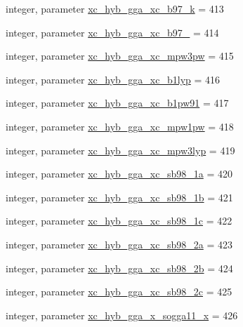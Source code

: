 \begin{DoxyCompactItemize}
\item 
integer, parameter \hyperlink{classlibxc__funcs__m_a78edfd528873c358d22ea9dbe638b4a0}{xc\-\_\-hyb\-\_\-gga\-\_\-xc\-\_\-b97\-\_\-k} = 413
\item 
integer, parameter \hyperlink{classlibxc__funcs__m_acc031fe40786b087f4a2bd2f64c7499a}{xc\-\_\-hyb\-\_\-gga\-\_\-xc\-\_\-b97\-\_} = 414
\item 
integer, parameter \hyperlink{classlibxc__funcs__m_ab109000084680f3346318a36c376b018}{xc\-\_\-hyb\-\_\-gga\-\_\-xc\-\_\-mpw3pw} = 415
\item 
integer, parameter \hyperlink{classlibxc__funcs__m_a1fccd3ef40f9d11885fadfb4e11ef55a}{xc\-\_\-hyb\-\_\-gga\-\_\-xc\-\_\-b1lyp} = 416
\item 
integer, parameter \hyperlink{classlibxc__funcs__m_acf4b49ffc62cdc8af7d7a31e52b80ba8}{xc\-\_\-hyb\-\_\-gga\-\_\-xc\-\_\-b1pw91} = 417
\item 
integer, parameter \hyperlink{classlibxc__funcs__m_ae0bf8522331000e27e11ce8429ba35c1}{xc\-\_\-hyb\-\_\-gga\-\_\-xc\-\_\-mpw1pw} = 418
\item 
integer, parameter \hyperlink{classlibxc__funcs__m_ab8b7ca71b38016c7b9d699433df2d1f8}{xc\-\_\-hyb\-\_\-gga\-\_\-xc\-\_\-mpw3lyp} = 419
\item 
integer, parameter \hyperlink{classlibxc__funcs__m_af95f7d45278e9a7857b3673c9ffc8cd3}{xc\-\_\-hyb\-\_\-gga\-\_\-xc\-\_\-sb98\-\_\-1a} = 420
\item 
integer, parameter \hyperlink{classlibxc__funcs__m_a034c5f3302bfee09bb120e937c22a51d}{xc\-\_\-hyb\-\_\-gga\-\_\-xc\-\_\-sb98\-\_\-1b} = 421
\item 
integer, parameter \hyperlink{classlibxc__funcs__m_a6b8f87c8627762f967f9ede6496f385e}{xc\-\_\-hyb\-\_\-gga\-\_\-xc\-\_\-sb98\-\_\-1c} = 422
\item 
integer, parameter \hyperlink{classlibxc__funcs__m_aa27090c192272b7b2ba392832abbd992}{xc\-\_\-hyb\-\_\-gga\-\_\-xc\-\_\-sb98\-\_\-2a} = 423
\item 
integer, parameter \hyperlink{classlibxc__funcs__m_addc17566f465bf9b348dc506398a0e8a}{xc\-\_\-hyb\-\_\-gga\-\_\-xc\-\_\-sb98\-\_\-2b} = 424
\item 
integer, parameter \hyperlink{classlibxc__funcs__m_aaee792018097c36729aa553f827744e3}{xc\-\_\-hyb\-\_\-gga\-\_\-xc\-\_\-sb98\-\_\-2c} = 425
\item 
integer, parameter \hyperlink{classlibxc__funcs__m_af01fbfae1518a5b3a46dfa78400cf033}{xc\-\_\-hyb\-\_\-gga\-\_\-x\-\_\-sogga11\-\_\-x} = 426
\item 

\end{DoxyCompactItemize}
